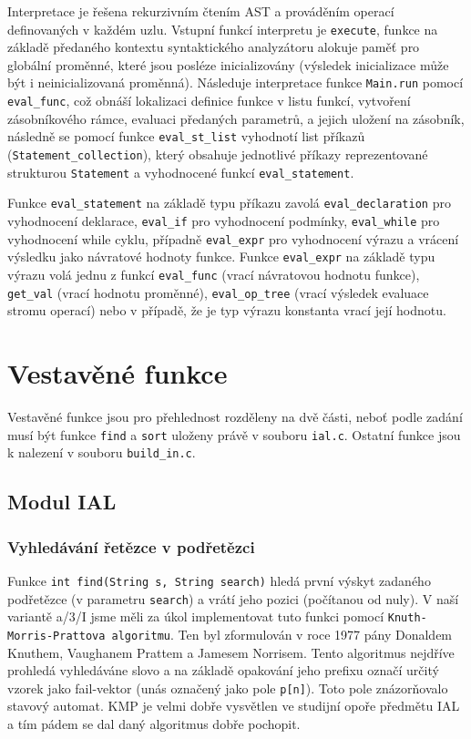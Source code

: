 \documentclass[a4paper,11pt]{article}
\begin{document}
Interpretace je řešena rekurzivním čtením AST a prováděním operací definovaných v každém uzlu. Vstupní funkcí interpretu je \texttt{execute}, funkce na základě předaného kontextu syntaktického analyzátoru alokuje paměť pro globální proměnné, které jsou posléze inicializovány (výsledek inicializace může být i neinicializovaná proměnná).
Následuje interpretace funkce \texttt{Main.run} pomocí \texttt{eval\_func}, což obnáší lokalizaci definice funkce v listu funkcí, vytvoření zásobníkového rámce, evaluaci předaných parametrů, a jejich uložení na zásobník, následně se pomocí funkce \texttt{eval\_st\_list} vyhodnotí list příkazů (\texttt{Statement\_collection}), který obsahuje jednotlivé příkazy reprezentované strukturou \texttt{Statement} a vyhodnocené funkcí \texttt{eval\_statement}.

Funkce \texttt{eval\_statement} na základě typu příkazu zavolá \texttt{eval\_declaration} pro vyhodnocení deklarace, \texttt{eval\_if} pro vyhodnocení podmínky, \texttt{eval\_while} pro vyhodnocení while cyklu, případně \texttt{eval\_expr} pro vyhodnocení výrazu a vrácení výsledku jako návratové hodnoty funkce.
Funkce \texttt{eval\_expr} na základě typu výrazu volá jednu z funkcí \texttt{eval\_func} (vrací návratovou hodnotu funkce), \texttt{get\_val} (vrací hodnotu proměnné), \texttt{eval\_op\_tree} (vrací výsledek evaluace stromu operací) nebo v případě, že je typ výrazu konstanta vrací její hodnotu.


\section{Vestavěné funkce}
Vestavěné funkce jsou pro přehlednost rozděleny na dvě části, neboť podle zadání musí být funkce \texttt{find} a \texttt{sort} uloženy právě v souboru \texttt{ial.c}. Ostatní funkce jsou k nalezení v souboru \texttt{build\_in.c}.

\subsection {Modul IAL}

\subsubsection {Vyhledávání řetězce v podřetězci}
Funkce \texttt{int find(String s, String search)} hledá první výskyt zadaného podřetězce (v parametru \texttt{search}) a vrátí jeho pozici (počítanou od nuly). V naší variantě a/3/I jsme měli za úkol implementovat tuto funkci pomocí \texttt{Knuth-Morris-Prattova algoritmu}. Ten byl zformulován v roce 1977 pány Donaldem Knuthem, Vaughanem Prattem a Jamesem Norrisem. Tento algoritmus nejdříve prohledá vyhledáváne slovo a na základě opakování jeho prefixu označí určitý vzorek jako fail-vektor (unás označený jako pole \texttt{p[n]}). Toto pole znázorňovalo stavový automat. KMP je velmi dobře vysvětlen ve studijní opoře předmětu IAL a tím pádem se dal daný algoritmus dobře pochopit.
\end{document}
